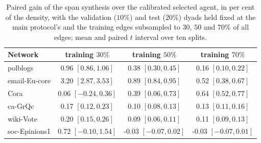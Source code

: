 \documentclass[12pt]{article}
\begin{document}
\begin{table}[ht]
\end{table}

\begin{table}[ht]
\centering
\caption{Paired gain of the span synthesis over the calibrated selected agent, in per cent of the density, with the validation ($10\%$) and test ($20\%$) dyads held fixed at the main protocol's and the training edges subsampled to $30$, $50$ and $70\%$ of all edges; mean and paired $t$ interval over ten splits.}
\label{tab:retention}
\begin{tabular}{lccc}
\toprule
Network & training $30\%$ & training $50\%$ & training $70\%$ \\
\midrule
polblogs & 0.96 $[0.86,1.06]$ & 0.38 $[0.30,0.45]$ & 0.16 $[0.10,0.22]$ \\
email-Eu-core & 3.20 $[2.87,3.53]$ & 0.89 $[0.84,0.95]$ & 0.52 $[0.38,0.67]$ \\
Cora & 0.06 $[-0.24,0.36]$ & 0.39 $[0.06,0.73]$ & 0.64 $[0.52,0.77]$ \\
ca-GrQc & 0.17 $[0.12,0.23]$ & 0.10 $[0.08,0.13]$ & 0.13 $[0.11,0.16]$ \\
wiki-Vote & 0.20 $[0.15,0.26]$ & 0.09 $[0.06,0.11]$ & 0.11 $[0.09,0.13]$ \\
soc-Epinions1 & 0.72 $[-0.10,1.54]$ & -0.03 $[-0.07,0.02]$ & -0.03 $[-0.07,0.01]$ \\
\bottomrule
\end{tabular}

\end{table}
\end{document}
